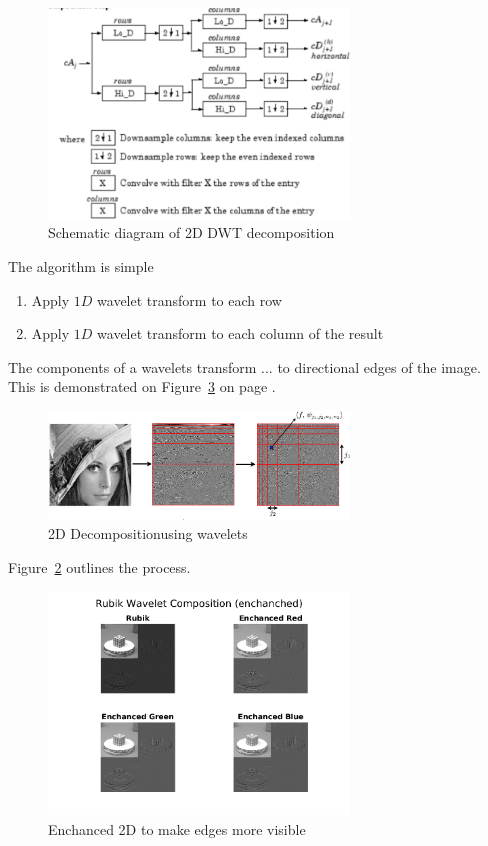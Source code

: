 \documentclass[a4paper,12pt]{article}
\begin{document}
\begin{figure}[tb]
        \centering
        \includegraphics[width=8cm]{diagram2.png}
        \caption{Schematic diagram of 2D DWT decomposition}
		\label{fig:wave1}
\end{figure}

\noindent The algorithm is simple
\begin{enumerate}
\item Apply $1D$ wavelet transform to each row
\item Apply $1D$ wavelet transform to each column of the result
\end{enumerate} 

\noindent The components of a wavelets transform ... to directional edges of the image. This is demonstrated on Figure~\ref{fig:rubik} on page \pageref{fig:rubik}.

\begin{figure}[bt]
        \centering
        \includegraphics[width=8cm]{explain2D.png}
        \caption{2D Decompositionusing wavelets}
		\label{fig:wave2}
\end{figure}
\noindent Figure~\ref{fig:wave2} outlines the process.


\begin{figure}[tb]
        \centering
        \includegraphics[width=8cm]{../Results/Rubik_Ench.png}
        \caption{Enchanced 2D to make edges more visible}
		\label{fig:rubik}
\end{figure}
\end{document}

